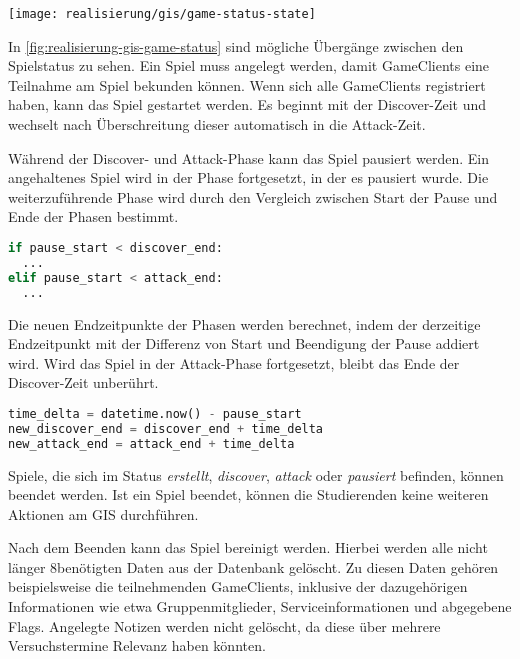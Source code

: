 \begin{center}
	\texttt{[image: realisierung/gis/game-status-state]}
	\label{fig:realisierung-gis-game-status}
\end{center}

In \autoref{fig:realisierung-gis-game-status} sind mögliche Übergänge zwischen den Spielstatus zu sehen. Ein Spiel muss angelegt werden, damit GameClients eine Teilnahme am Spiel bekunden können. Wenn sich alle GameClients registriert haben, kann das Spiel gestartet werden. Es beginnt mit der Discover-Zeit und wechselt nach Überschreitung dieser automatisch in die Attack-Zeit.

Während der Discover- und Attack-Phase kann das Spiel pausiert werden. Ein angehaltenes Spiel wird in der Phase fortgesetzt, in der es pausiert wurde. Die weiterzuführende Phase wird durch den Vergleich zwischen Start der Pause und Ende der Phasen bestimmt.

\begin{lstlisting}[language=Python, frame=single, caption={GIS Spiel fortsetzen}, captionpos=b, label={lst:gis-resume-game}]
if pause_start < discover_end:
  ...
elif pause_start < attack_end:
  ...
\end{lstlisting}

Die neuen Endzeitpunkte der Phasen werden berechnet, indem der derzeitige Endzeitpunkt mit der Differenz von Start und Beendigung der Pause addiert wird. Wird das Spiel in der Attack-Phase fortgesetzt, bleibt das Ende der Discover-Zeit unberührt. \\

\begin{lstlisting}[language=Python, frame=single, caption={GIS Neues Ende berechnen}, captionpos=b, label={lst:gis-pause-add-time}]
time_delta = datetime.now() - pause_start
new_discover_end = discover_end + time_delta
new_attack_end = attack_end + time_delta
\end{lstlisting}

Spiele, die sich im Status \textit{erstellt}, \textit{discover}, \textit{attack} oder \textit{pausiert} befinden, können beendet \linebreak werden. Ist ein Spiel beendet, können die Studierenden keine weiteren Aktionen am GIS durchführen.

Nach dem Beenden kann das Spiel bereinigt werden. Hierbei werden alle nicht länger \linebreak 8benötigten Daten aus der Datenbank gelöscht. Zu diesen Daten gehören beispielsweise die teilnehmenden GameClients, inklusive der dazugehörigen Informationen wie etwa Gruppenmitglieder, Serviceinformationen und abgegebene Flags. Angelegte Notizen werden nicht \linebreak gelöscht, da diese über mehrere Versuchstermine Relevanz haben könnten.\\

